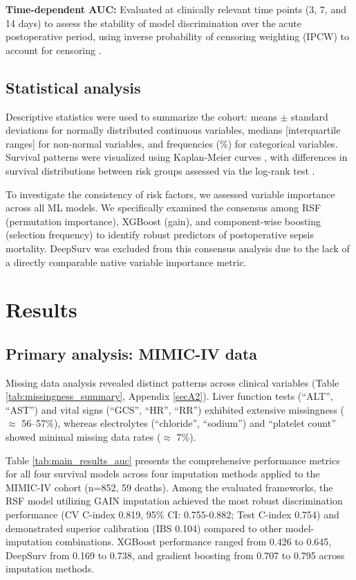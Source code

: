\documentclass[pdflatex,sn-mathphys-num]{sn-jnl}%
\theoremstyle{thmstyleone}%
\theoremstyle{thmstyletwo}%
\theoremstyle{thmstylethree}%
\begin{document}
\textbf{Time-dependent AUC:} Evaluated at clinically relevant time points (3, 7, and 14 days) to assess the stability of model discrimination over the acute postoperative period, using inverse probability of censoring weighting (IPCW) to account for censoring \cite{heagerty2005survival, hung2010estimation}.

\subsection{Statistical analysis}
Descriptive statistics were used to summarize the cohort: means $\pm$ standard deviations for normally distributed continuous variables, medians [interquartile ranges] for non-normal variables, and frequencies (\%) for categorical variables. Survival patterns were visualized using Kaplan-Meier curves \cite{kaplan1958nonparametric}, with differences in survival distributions between risk groups assessed via the log-rank test \cite{peto1972asymptotically}.

To investigate the consistency of risk factors, we assessed variable importance across all ML models. We specifically examined the consensus among RSF (permutation importance), XGBoost (gain), and component-wise boosting (selection frequency) to identify robust predictors of postoperative sepsis mortality. DeepSurv was excluded from this consensus analysis due to the lack of a directly comparable native variable importance metric.

\section{Results}\label{sec3}

\subsection{Primary analysis: MIMIC-IV data}\label{sec3.1}

Missing data analysis revealed distinct patterns across clinical variables (Table \ref{tab:missingness_summary}, Appendix \ref{secA2}). Liver function tests (``ALT'', ``AST'') and vital signs (``GCS'', ``HR'', ``RR'') exhibited extensive missingness ($\approx$ 56--57\%), whereas electrolytes (``chloride'', ``sodium'') and ``platelet count'' showed minimal missing data rates ($\approx$ 7\%).

Table \ref{tab:main_results_auc} presents the comprehensive performance metrics for all four survival models across four imputation methods applied to the MIMIC-IV cohort (n=852, 59 deaths). Among the evaluated frameworks, the RSF model utilizing GAIN imputation achieved the most robust discrimination performance (CV C-index 0.819, 95\% CI: 0.755-0.882; Test C-index 0.754) and demonstrated superior calibration (IBS 0.104) compared to other model-imputation combinations. XGBoost performance ranged from 0.426 to 0.645, DeepSurv from 0.169 to 0.738, and gradient boosting from 0.707 to 0.795 across imputation methods.
\end{document}
